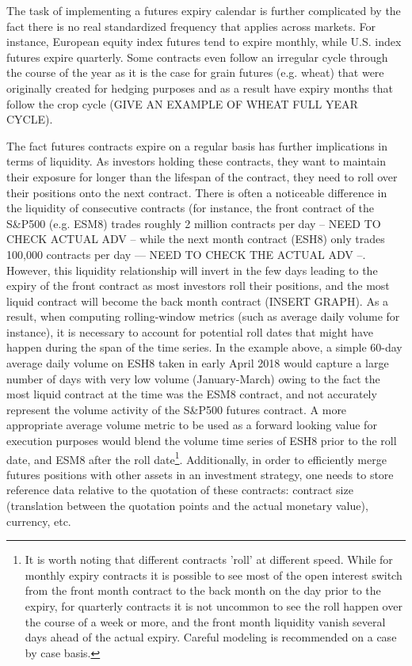 \begin{itemize}
The task of implementing a futures expiry calendar is further complicated by the fact there is no real standardized frequency that applies across markets. For instance, European equity index futures tend to expire monthly, while U.S. index futures expire quarterly. Some contracts even follow an irregular cycle through the course of the year as it is the case for grain futures (e.g. wheat) that were originally created for hedging purposes and as a result have expiry months that follow the crop cycle (GIVE AN EXAMPLE OF WHEAT FULL YEAR CYCLE).

The fact futures contracts expire on a regular basis has further implications in terms of liquidity. As investors holding these contracts, they want to maintain their exposure for longer than the lifespan of the contract, they need to roll over their positions onto the next contract. There is often a noticeable difference in the liquidity of consecutive contracts (for instance, the front contract of the S\&P500 (e.g. ESM8) trades roughly 2 million contracts per day -- NEED TO CHECK ACTUAL ADV -- while the next month contract (ESH8) only trades 100,000 contracts per day --- NEED TO CHECK THE ACTUAL ADV --. However, this liquidity relationship will invert in the few days leading to the expiry of the front contract as most investors roll their positions, and the most liquid contract will become the back month contract (INSERT GRAPH). As a result, when computing rolling-window metrics (such as average daily volume for instance), it is necessary to account for potential roll dates that might have happen during the span of the time series. In the example above, a simple 60-day average daily volume on ESH8 taken in early April 2018 would capture a large number of days with very low volume (January-March) owing to the fact the most liquid contract at the time was the ESM8 contract, and not accurately represent the volume activity of the S\&P500 futures contract. A more appropriate average volume metric to be used as a forward looking value for execution purposes would blend the volume time series of ESH8 prior to the roll date, and ESM8 after the roll date\footnote{It is worth noting that different contracts 'roll' at different speed. While for monthly expiry contracts it is possible to see most of the open interest switch from the front month contract to the back month on the day prior to the expiry, for quarterly contracts it is not uncommon to see the roll happen over the course of a week or more, and the front month liquidity vanish several days ahead of the actual expiry. Careful modeling is recommended on a case by case basis.}. Additionally, in order to efficiently merge futures positions with other assets in an investment strategy, one needs to store reference data relative to the quotation of these contracts: contract size (translation between the quotation points and the actual monetary value), currency, etc. 


\end{itemize}

